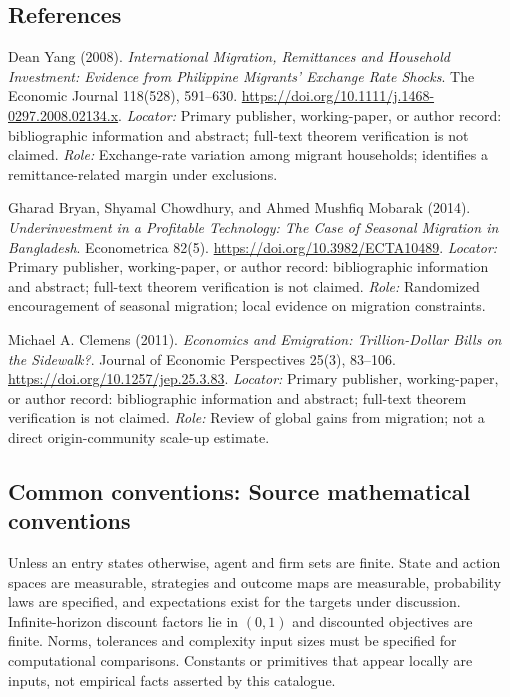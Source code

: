 \documentclass[11pt,a4paper]{article}
\begin{document}
\subsection*{References}
\begin{enumerate}[label=\textnormal{[S\arabic*]},leftmargin=*]
\item Dean Yang (2008). \emph{International Migration, Remittances and Household Investment: Evidence from Philippine Migrants' Exchange Rate Shocks}. The Economic Journal 118(528), 591--630. \url{https://doi.org/10.1111/j.1468-0297.2008.02134.x}. \textit{Locator:} Primary publisher, working-paper, or author record: bibliographic information and abstract; full-text theorem verification is not claimed. \textit{Role:} Exchange-rate variation among migrant households; identifies a remittance-related margin under exclusions.
\item Gharad Bryan, Shyamal Chowdhury, and Ahmed Mushfiq Mobarak (2014). \emph{Underinvestment in a Profitable Technology: The Case of Seasonal Migration in Bangladesh}. Econometrica 82(5). \url{https://doi.org/10.3982/ECTA10489}. \textit{Locator:} Primary publisher, working-paper, or author record: bibliographic information and abstract; full-text theorem verification is not claimed. \textit{Role:} Randomized encouragement of seasonal migration; local evidence on migration constraints.
\item Michael A. Clemens (2011). \emph{Economics and Emigration: Trillion-Dollar Bills on the Sidewalk?}. Journal of Economic Perspectives 25(3), 83--106. \url{https://doi.org/10.1257/jep.25.3.83}. \textit{Locator:} Primary publisher, working-paper, or author record: bibliographic information and abstract; full-text theorem verification is not claimed. \textit{Role:} Review of global gains from migration; not a direct origin-community scale-up estimate.
\end{enumerate}

\subsection*{Common conventions: Source mathematical conventions}

Unless an entry states otherwise, agent and firm sets are finite. State and action spaces are measurable, strategies and outcome maps are measurable, probability laws are specified, and expectations exist for the targets under discussion. Infinite-horizon discount factors lie in $(0,1)$ and discounted objectives are finite. Norms, tolerances and complexity input sizes must be specified for computational comparisons. Constants or primitives that appear locally are inputs, not empirical facts asserted by this catalogue.
\end{document}

